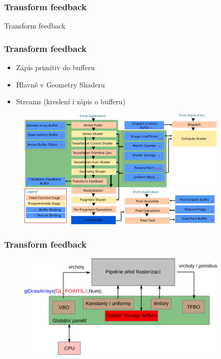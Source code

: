 \begin{frame}
\frametitle{Transform feedback}
\begin{center}
\Huge {\color{white}Transform feedback}
\end{center}
\end{frame}

\begin{frame}
\frametitle{Transform feedback}
	\begin{itemize}
	\item Zápis primitiv do bufferu
	\item Hlavně v Geometry Shaderu
	\item Streams (kreslení i zápis o bufferu)
	\end{itemize}
	\begin{figure}[h]
	\includegraphics[width=10cm,keepaspectratio]{pics/transformFeedback/tf_pipeline}
	\end{figure}
\end{frame}

\begin{frame}
\frametitle{Transform feedback}
	\begin{figure}[h]
	\includegraphics[width=10cm,keepaspectratio]{pics/transformFeedback/tf_mem}
	\end{figure}
\end{frame}

